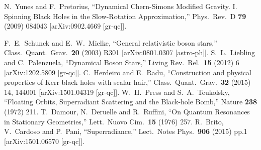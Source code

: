 \begin{small}
\begin{thebibliography}{99}
  N.~Yunes and F.~Pretorius,
  ``Dynamical Chern-Simons Modified Gravity. I. Spinning Black Holes in the Slow-Rotation Approximation,''
  Phys.\ Rev.\ D {\bf 79} (2009) 084043
  [arXiv:0902.4669 [gr-qc]].
 
  F.~E.~Schunck and E.~W.~Mielke,
  ``General relativistic boson stars,''
  Class.\ Quant.\ Grav.\  {\bf 20} (2003) R301
  [arXiv:0801.0307 [astro-ph]].
  S.~L.~Liebling and C.~Palenzuela,
  ``Dynamical Boson Stars,''
  Living Rev.\ Rel.\  {\bf 15} (2012) 6
  [arXiv:1202.5809 [gr-qc]].
  C.~Herdeiro and E.~Radu,
  ``Construction and physical properties of Kerr black holes with scalar hair,''
  Class.\ Quant.\ Grav.\  {\bf 32} (2015) 14,  144001
  [arXiv:1501.04319 [gr-qc]].
  W.~H.~Press and S.~A.~Teukolsky,
  ``Floating Orbits, Superradiant Scattering and the Black-hole Bomb,''
  Nature {\bf 238} (1972) 211.
  T.~Damour, N.~Deruelle and R.~Ruffini,
  ``On Quantum Resonances in Stationary Geometries,''
  Lett.\ Nuovo Cim.\  {\bf 15} (1976) 257.
  R.~Brito, V.~Cardoso and P.~Pani,
  ``Superradiance,''
  Lect.\ Notes Phys.\  {\bf 906} (2015) pp.1
  [arXiv:1501.06570 [gr-qc]].
  

\end{thebibliography}
\end{small}
